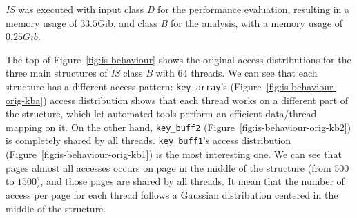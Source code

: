 \emph{IS} was executed with input class \emph{D} for the performance
evaluation, resulting in a memory usage of $33.5$Gib, and class \emph{B} for
the analysis, with a memory usage of $0.25Gib$.

\begin{figure*}[htb]
    \centering


    \caption{Memory access distribution for the main structures of
        \emph{IS}. Original behavior on the top, modified on
    the bottom.}
    \label{fig:is-behaviour}

\end{figure*}

The top of Figure~\ref{fig:is-behaviour} shows the original access distributions for the
three main structures of \emph{IS} class \emph{B} with $64$ threads. We can see that
each structure has a different access pattern: \texttt{key\_array}'s
(Figure~\ref{fig:is-behaviour-orig-kba}) access distribution shows that each
thread works on a different part of the structure, which let automated
tools perform an efficient data/thread mapping on it. On the other hand, \texttt{key\_buff2}
(Figure~\ref{fig:is-behaviour-orig-kb2}) is completely shared by all threads.
\texttt{key\_buff1}'s access distribution (Figure~\ref{fig:is-behaviour-orig-kb1})
is the most interesting one. We can see that pages almost all accesses occurs
on page in the middle of the structure (from $500$ to $1500$), and those pages
are shared by all threads. It mean that the number of access per page  for
each thread follows a Gaussian distribution centered in the middle of the
structure.

